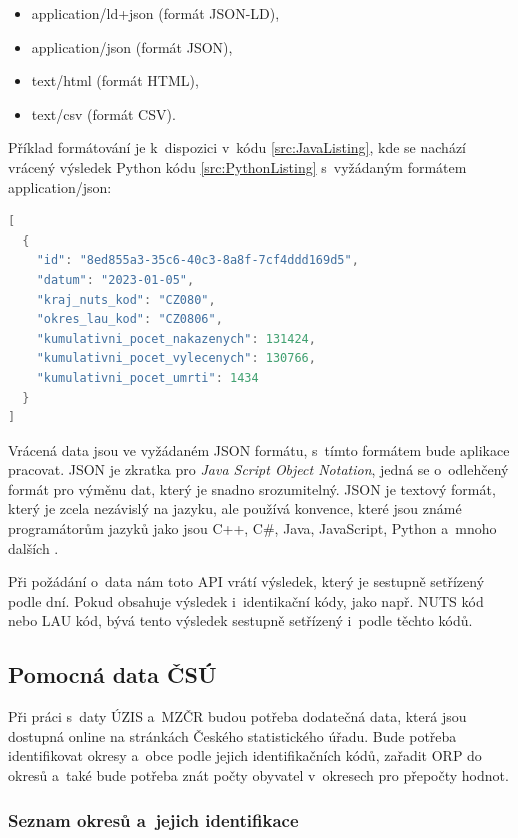 \begin{itemize}
    \item application/ld+json (formát JSON-LD),
    \item application/json (formát JSON),
    \item text/html (formát HTML),
    \item text/csv (formát CSV).
\end{itemize}

Příklad formátování je k~dispozici v~kódu \ref{src:JavaListing}, kde se nachází vrácený výsledek Python kódu \ref{src:PythonListing} s~vyžádaným formátem application/json:

\begin{lstlisting}[language=Java,label=src:JavaListing,caption={Příklad vráceného výsledku API}]
[
  {
    "id": "8ed855a3-35c6-40c3-8a8f-7cf4ddd169d5",
    "datum": "2023-01-05",
    "kraj_nuts_kod": "CZ080",
    "okres_lau_kod": "CZ0806",
    "kumulativni_pocet_nakazenych": 131424,
    "kumulativni_pocet_vylecenych": 130766,
    "kumulativni_pocet_umrti": 1434
  }
]

\end{lstlisting}

Vrácená data jsou ve vyžádaném JSON formátu, s~tímto formátem bude aplikace pracovat. JSON je zkratka pro \emph{Java Script Object Notation}, jedná se o~odlehčený formát pro výměnu dat, který je snadno srozumitelný. JSON je textový formát, který je zcela nezávislý na jazyku, ale používá konvence, které jsou známé programátorům jazyků jako jsou C++, C\#, Java, JavaScript, Python a~mnoho dalších \cite{json-definice}.

Při požádání o~data nám toto API vrátí výsledek, který je sestupně setřízený podle dní. Pokud obsahuje výsledek i~identikační kódy, jako např. NUTS kód nebo LAU kód, bývá tento výsledek sestupně setřízený i~podle těchto kódů.

\subsection{Pomocná data ČSÚ}
\label{csu}
Při práci s~daty ÚZIS a~MZČR budou potřeba dodatečná data, která jsou dostupná online na stránkách Českého statistického úřadu. Bude potřeba identifikovat okresy a~obce podle jejich identifikačních kódů, zařadit ORP do okresů a~také bude potřeba znát počty obyvatel v~okresech pro přepočty hodnot.

\subsubsection*{Seznam okresů a~jejich identifikace}

